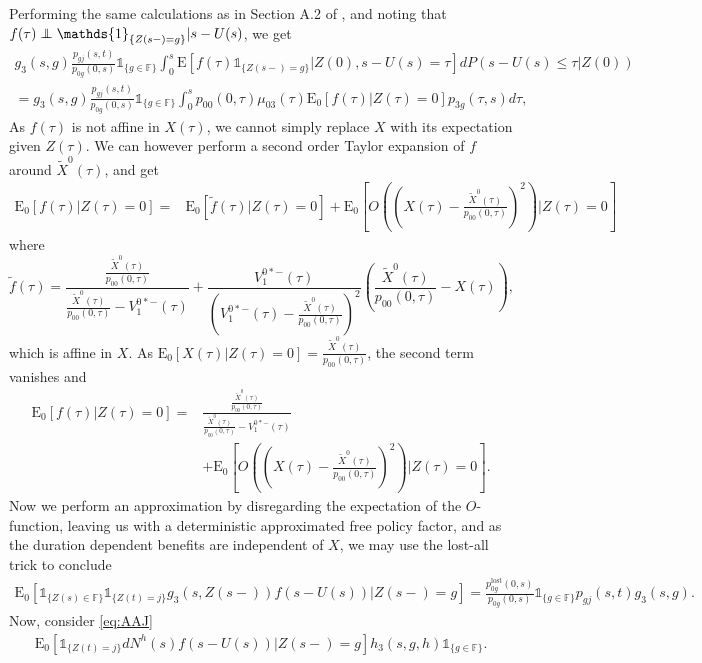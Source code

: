 \documentclass[12pt]{article}
\newcommand{\E}{\text{E}}
\newcommand{\indic}[1]{\mathds{1}_{ \{ #1 \} }}
\newcommand\independent{\protect\mathpalette{\protect\independenT}{\perp}}
\def\independenT#1#2{\mathrel{\rlap{$#1#2$}\mkern2mu{#1#2}}}
\theoremstyle{my_thm}
\begin{document}
Performing the same calculations as in Section A.2 of \citet{THM_BUC}, and noting that $f(\tau)\independent \indic{Z(s-)=g}|s-U(s)$, we get
\begin{align*}
g_3(s,g)\frac{p_{gj}(s,t)}{p_{0g}(0,s)} \indic{g \in \mathbb{F}} \int_0^s  \E[f(\tau)\indic{Z(s-)=g}|Z(0),s-U(s)=\tau] dP(s-U(s)\leq \tau | Z(0))
\\
=
g_3(s,g)\frac{p_{gj}(s,t)}{p_{0g}(0,s)} \indic{g \in \mathbb{F}} \int_0^s p_{00}(0,\tau) \mu_{03}(\tau) \E_0[ f(\tau)|Z(\tau)=0] p_{3g}(\tau,s) d\tau,
\end{align*}
As $f(\tau)$ is not affine in $X(\tau)$, we cannot simply replace $X$ with its expectation given $Z(\tau)$. We can however perform a second order Taylor expansion of $f$ around $\tilde{X}^0(\tau)$, and get
\begin{align*}
\E_0[f(\tau) |Z(\tau)=0]
=&
\E_0[\tilde{f}(\tau) |Z(\tau)=0]+ 
\E_0 \left[ O \left( \left( X(\tau)-\frac{\tilde{X}^0(\tau)}{p_{00}(0,\tau)} \right) ^2 \right) \bigg| Z(\tau)=0 \right]
\end{align*}
where 
$$
\tilde{f}(\tau)=
\frac{
	\frac{\tilde{X}^0(\tau)}{p_{00}(0,\tau)}
}{
	\frac{\tilde{X}^0(\tau)}{p_{00}(0,\tau)}
	-V_1^{0*-}(\tau)
}
+
\frac{
	V_1^{0*-}(\tau)
	}{
	\left( V_1^{0*-}(\tau)-
	\frac{\tilde{X}^0(\tau)}{p_{00}(0,\tau)}
	\right)^2
}
\left( \frac{\tilde{X}^0(\tau)}{p_{00}(0,\tau)}-X(\tau)\right),
$$
which is affine in $X$. As $\E_0[X(\tau)|Z(\tau)=0]=\frac{\tilde{X}^0(\tau)}{p_{00}(0,\tau)}$, the second term vanishes and
\begin{align*}
\E_0[f(\tau) |Z(\tau)=0]
=&
\frac{
	\frac{\tilde{X}^0(\tau)}{p_{00}(0,\tau)}
}{
	\frac{\tilde{X}^0(\tau)}{p_{00}(0,\tau)}
	-V_1^{0*-}(\tau)
}
\\
&+
\E_0 \left[ O \left( \left( X(\tau)-\frac{\tilde{X}^0(\tau)}{p_{00}(0,\tau)} \right) ^2 \right) \bigg| Z(\tau)=0 \right].
\end{align*}
Now we perform an approximation by disregarding the expectation of the $O$-function, leaving us with a deterministic approximated free policy factor, and as the duration dependent benefits are independent of $X$, we may use the lost-all trick to conclude
\begin{align*}
\E_0 [ \indic{Z(s) \in \mathbb{F}} \indic{Z(t)=j} g_3(s,Z(s-)) f(s-U(s))|Z(s-)=g]
=
\frac{p^{\text{lost}}_{0g}(0,s)}{p_{0g}(0,s)} \indic{g \in \mathbb{F}} p_{gj}(s,t)g_3(s,g).
\end{align*}
Now, consider \eqref{eq:AAJ}
\begin{align*}
\E_0 [  \indic{Z(t)=j}  dN^h(s) f(s-U(s))|Z(s-)=g] h_3(s,g,h) \indic{g \in \mathbb{F}}.
\end{align*}
\end{document}
